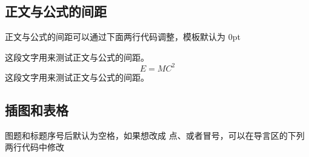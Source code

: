 \documentclass[a4paper,zihao=-4]{article}
\newcommand{\songti}{}
\newcommand{\zihao}[1]{\fontsize{12pt}{0}}
\begin{document}
\begin{CJK*}{UTF8}{gbsn}
\begin{spacing}{1.3} %
	\zihao{5} \songti   
	
	  
	\vspace{11bp}
\end{spacing}

\subsection{正文与公式的间距}
正文与公式的间距可以通过下面两行代码调整，模板默认为 0pt

\setlength{\abovedisplayskip}{0pt}
\setlength{\belowdisplayskip}{0pt}

这段文字用来测试正文与公式的间距。
\begin{equation}
	E = MC^2
\end{equation}
这段文字用来测试正文与公式的间距。

\subsection{插图和表格}
图题和标题序号后默认为空格，如果想改成 点、或者冒号，可以在导言区的下列两行代码中修改


\end{CJK*}
\end{document}
